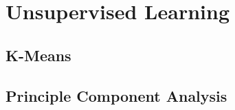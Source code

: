 \section{Unsupervised Learning}
\begin{mdframed}[style=eqbox]
\subsection{K-Means}
\end{mdframed}
%
\begin{mdframed}[style=eqbox]
\subsection{Principle Component Analysis}
\end{mdframed}